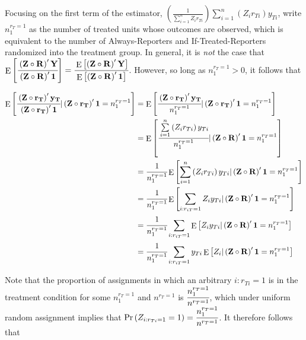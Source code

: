 \documentclass[
  12pt,
  leqno]{article}
\DeclareMathOperator{\E}{\mathrm{E}}
\DeclareMathOperator{\1}{\mathbbm{1}}
\begin{document}
Focusing on the first term of the estimator,
\(\left(\frac{1}{\sum \limits_{i = 1}^n Z_i r_{Ti}}\right) \sum \limits_{i = 1}^n \left(Z_i r_{Ti}\right) y_{Ti}\),
write \(n_1^{r_T = 1}\) as the number of treated units whose outcomes
are observed, which is equivalent to the number of Always-Reporters and
If-Treated-Reporters randomized into the treatment group. In general, it
is \textit{not} the case that
\(\E\left[\cfrac{\left(\mathbf{Z} \circ \mathbf{R}\right)'\mathbf{Y}}{\left(\mathbf{Z} \circ \mathbf{R}\right)'\mathbf{1}}\right] = \cfrac{\E\left[\left(\mathbf{Z} \circ \mathbf{R}\right)'\mathbf{Y}\right]}{\E\left[\left(\mathbf{Z} \circ \mathbf{R}\right)'\mathbf{1}\right]}\).
However, so long as \(n_1^{r_T = 1} > 0\), it follows that

\begin{align*}
\E\left[\cfrac{\left(\mathbf{Z} \circ \mathbf{r_T}\right)' \mathbf{y_T}}{\left(\mathbf{Z} \circ \mathbf{r_T}\right)' \mathbf{1}} | \left(\mathbf{Z} \circ \mathbf{r_T}\right)' \mathbf{1} = n_1^{r_T = 1}\right] & = \E\left[\cfrac{\left(\mathbf{Z} \circ \mathbf{r_T}\right)' \mathbf{y_T}}{n_1^{r_T = 1}} | \left(\mathbf{Z} \circ \mathbf{r_T}\right)' \mathbf{1} = n_1^{r_T = 1}\right] \\ 
& = \E\left[\cfrac{\sum \limits_{i = 1}^n \left(Z_i r_{Ti}\right) y_{Ti}}{n_1^{r_T = 1}} | \left(\mathbf{Z} \circ \mathbf{R}\right)' \mathbf{1} = n_1^{r_T = 1}\right] \\
& = \cfrac{1}{n_1^{r_T = 1}} \E\left[\sum \limits_{i = 1}^n \left(Z_i r_{Ti}\right) y_{Ti} | \left(\mathbf{Z} \circ \mathbf{R}\right)' \mathbf{1} = n_1^{r_T = 1}\right] \\
& = \cfrac{1}{n_1^{r_T = 1}} \E\left[\sum \limits_{i: r_{iT} = 1} Z_i y_{Ti} | \left(\mathbf{Z} \circ \mathbf{R}\right)' \mathbf{1} = n_1^{r_T = 1}\right] \\ 
& = \cfrac{1}{n_1^{r_T = 1}} \sum \limits_{i: r_{iT} = 1} \E\left[Z_i y_{Ti} | \left(\mathbf{Z} \circ \mathbf{R}\right)' \mathbf{1} = n_1^{r_T = 1}\right] \\
& = \cfrac{1}{n_1^{r_T = 1}} \sum \limits_{i: r_{iT} = 1} y_{Ti} \E\left[Z_i | \left(\mathbf{Z} \circ \mathbf{R}\right)' \mathbf{1} = n_1^{r_T = 1}\right]
\end{align*}

Note that the proportion of assignments in which an arbitrary
\(i: r_{Ti} = 1\) is in the treatment condition for some
\(n_1^{r_T = 1}\) and \(n^{r_T = 1}\) is
\(\cfrac{n_1^{r_T = 1}}{n^{r_T = 1}}\), which under uniform random
assignment implies that
\(\Pr\left(Z_{i:r_{Ti} = 1} = 1\right) = \cfrac{n_1^{r_T = 1}}{n^{r_T = 1}}\).
It therefore follows that
\end{document}
